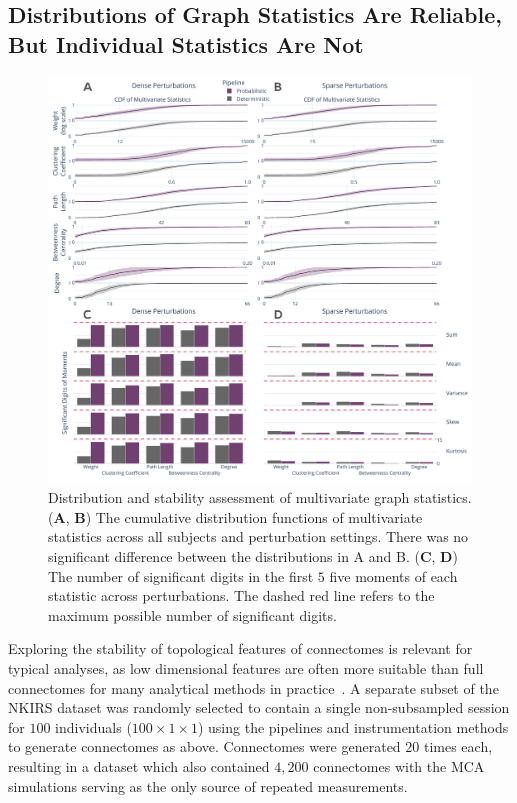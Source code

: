 \documentclass[fleqn,10pt]{SelfArx} %
\newcommand{\new}[1]{{\color{blue} #1}}
\begin{document}
\subsection*{Distributions of Graph Statistics Are Reliable, But Individual Statistics Are Not}
\begin{figure}[bht!]\centering
\includegraphics[width=\linewidth]{figures/fig2_multivariate_differences.pdf}
\caption{Distribution and stability assessment of multivariate graph statistics. (\textbf{A}, \textbf{B}) The
cumulative distribution functions of multivariate statistics across all subjects and perturbation settings. There was
no significant difference between the distributions in A and B. (\textbf{C}, \textbf{D}) The number of significant
digits in the first $5$ five moments of each statistic across perturbations. The dashed red line refers to the maximum
possible number of significant digits.}
\label{fig:multivar}
\end{figure}

Exploring the stability of topological features of connectomes is relevant for typical analyses, as low dimensional
features are often more suitable than full connectomes for many analytical methods in practice~\cite{Rubinov2010-fh}.
A separate subset of the NKIRS dataset was randomly selected to contain a single non-subsampled session for $100$
individuals \new{($100 \times 1 \times 1$) using the pipelines and instrumentation methods to generate connectomes as
above. Connectomes were generated $20$ times each, resulting in a dataset which also contained $4,200$ connectomes with
the MCA simulations serving as the only source of repeated measurements.}
\end{document}
